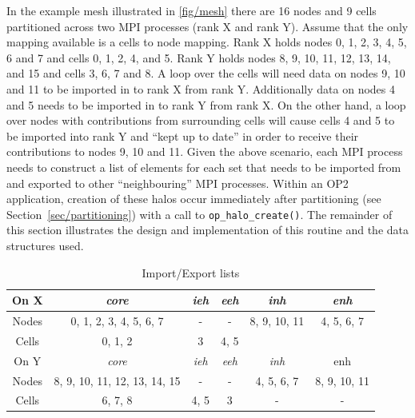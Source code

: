 \documentclass[11pt]{article}
\begin{document}
\noindent In the example mesh illustrated in \figurename{ \ref{fig/mesh}} there
are 16 nodes and 9 cells partitioned across two MPI processes (rank X and rank
Y). Assume that the only mapping available is a cells to node mapping. Rank X
holds nodes 0, 1, 2, 3, 4, 5, 6 and 7 and cells 0, 1, 2, 4, and 5. Rank Y holds
nodes 8, 9, 10, 11, 12, 13, 14,  and 15 and cells 3, 6, 7 and 8. A loop over the
cells will need data on nodes 9, 10 and 11 to be imported in to rank X from
rank Y. Additionally data on nodes 4 and 5 needs to be imported in to rank Y
from rank X. On the other hand, a loop over nodes with contributions from
surrounding cells will cause cells 4 and 5 to be imported into rank Y and ``kept
up to date'' in order to receive their contributions to nodes 9, 10 and 11.
Given the above scenario, each MPI process needs to construct a list of elements
for each set that needs to be imported from and exported to other
``neighbouring'' MPI processes. Within an OP2 application, creation of these
halos occur immediately after partitioning (see Section~\ref{sec/partitioning}) with a call to
\texttt{op\_halo\_create()}. The remainder of this section illustrates the
design and implementation of this routine and the data structures used.


\begin{table}[t]
\centering\vspace{-10pt}
\caption{Import/Export lists}\small
\begin{tabular}{|c|c|c|c|c|c|} \hline
On X 	& \textit{core}	& \textit{ieh}	& \textit{eeh} 	& \textit{inh}	&
\textit{enh} 	\\\hline
Nodes	& 0, 1, 2, 3, 4, 5, 6, 7	& -	& -	& 8, 9, 10, 11	& 4, 5,
6, 7	\\\hline
Cells	& 0, 1, 2			& 3	& 4, 5	&	&\\\hline\hline
On Y 	& \textit{core}	& \textit{ieh}	& \textit{eeh}	& \textit{inh} & enh
\\\hline
Nodes	& 8, 9, 10, 11, 12, 13, 14, 15	& -	& -	& 4, 5, 6, 7	& 8, 9,
10, 11 	\\\hline
Cells	& 6, 7, 8	& 4, 5	& 3	& -		& - \\\hline
\end{tabular}\label{tab/impexp}\vspace{-0pt}
\end{table}\normalsize
\end{document}
